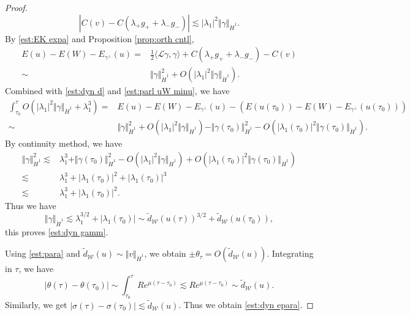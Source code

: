 \documentclass[reqno, 11pt]{amsart}
\numberwithin{equation}{section}
\theoremstyle{plain}
\theoremstyle{definition}
\numberwithin{equation}{section}
\numberwithin{theorem}{section}
\numberwithin{equation}{section}
\numberwithin{equation}{section}
\numberwithin{theorem}{section}
\begin{document}
\begin{proof}
		\begin{equation*}
		|C(v)-C(\lambda_+g_{+}+\lambda_{-}g_{-})|\lesssim |\lambda_{1}|^{2}	\Vert \gamma \Vert_{\dot H^1}.
		\end{equation*}
		By \eqref{est:EK expa} and  Proposition \ref{prop:orth cntl}, 
		\begin{equation}\label{est:uW minu}
		\begin{aligned}
		E(u)-E(W)-E_{\gamma^{\bot}}(u)=&\frac{1}{2}\langle \mathcal{L}\gamma,\gamma \rangle+C(\lambda_+g_{+}+\lambda_{-}g_{-})-C(v)\\ \sim&\Vert \gamma \Vert_{\dot H^1}^{2}+O(|\lambda_{1}|^{2}	\Vert \gamma \Vert_{\dot H^1}).
		\end{aligned}
		\end{equation}		
		Combined with \eqref{est:dyn d} and \eqref{est:parl uW minu}, we have 
		\begin{equation*}
		\begin{aligned}
		\int_{\tau_0}^{\tau} O(|\lambda_{1}|^{2}\Vert \gamma \Vert_{\dot H^1}+\lambda_{1}
		^3)=&E(u)-E(W)-E_{\gamma^{\bot}}(u)-\left(	E(u(\tau_0))-E(W)-E_{\gamma^{\bot}}(u(\tau_0))\right)\\\sim& \Vert \gamma \Vert_{\dot H^1}^{2}+O(|\lambda_{1}|^{2}	\Vert \gamma \Vert_{\dot H^1})-\Vert \gamma(\tau_0) \Vert_{\dot H^1}^{2}-O(|\lambda_{1}(\tau_0)|^{2}	\Vert \gamma(\tau_0 )\Vert_{\dot H^1}).
		\end{aligned}
		\end{equation*}
		By continuity method, we have
		\begin{equation*}
		\begin{aligned}
		\Vert \gamma \Vert_{\dot H^1}^{2}\lesssim&\lambda_{1}^3+\Vert \gamma(\tau_0) \Vert_{\dot H^1}^{2}-O(|\lambda_{1}|^2\Vert \gamma \Vert_{\dot H^1}) + O(|\lambda_{1}(\tau_0)|^2\Vert \gamma(\tau_0) \Vert_{\dot H^1})\\\lesssim&\lambda_{1}^3+|\lambda_{1}(\tau_0)|^2+|\lambda_{1}(\tau_0)|^3\\\lesssim&\lambda_{1}^3+|\lambda_{1}(\tau_0)|^2.
		\end{aligned}
		\end{equation*}
		Thus we have
		\begin{equation*}
		\Vert \gamma \Vert_{\dot H^1}\lesssim\lambda_{1}^{3/2}+|\lambda_{1}(\tau_0)|\sim\widetilde{d}_{\mathcal{W}}(u(\tau))^{3/2}+ \widetilde{d}_{\mathcal{W}}(u(\tau_0)),
		\end{equation*}
		this proves \eqref{est:dyn gamm}.
		
		Using \eqref{est:para} and $\widetilde{d}_{\mathcal{W}}(u)\sim \Vert v\Vert_{\dot H^1}$, we obtain $\pm\theta_\tau=O(\widetilde{d}_{\mathcal{W}}(u))$. Integrating in $\tau$, we have
		\begin{equation*}
		|\theta(\tau)-\theta(\tau_0)|\sim \int_{\tau_0}^{\tau}Re^{\mu(\tau-\tau_0)}\lesssim Re^{\mu(\tau-\tau_0)}\sim \widetilde{d}_{\mathcal{W}}(u).
		\end{equation*}
		Similarly, we get $|\sigma(\tau)-\sigma(\tau_0)|\lesssim \widetilde{d}_{\mathcal{W}}(u)$. Thus we obtain \eqref{est:dyn epara}.
		

\end{proof}
\end{document}
